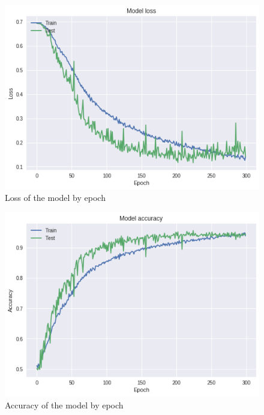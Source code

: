\documentclass[a4paper]{article}
\begin{document}
\begin{figure}[h!]
	\centering
	\includegraphics[scale=.6]{VGGLoss_of2.png}
	\caption{Loss of the model by epoch}
	\label{fig:vggloss}
\end{figure}

\begin{figure}[h!]
	\centering
	\includegraphics[scale=.6]{VGGAccu_of2.png}
	\caption{Accuracy of the model by epoch}
	\label{fig:vggacc}
\end{figure}

\newpage
\end{document}
